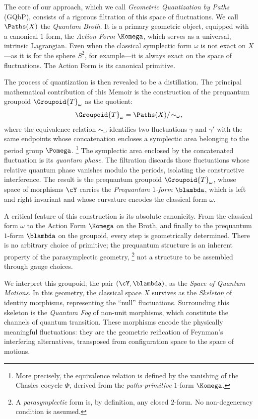 The core of our approach,
which we call \emph{Geometric Quantization by Paths} (GQbP),
consists of a rigorous filtration of this space of fluctuations.
We call $\Paths(X)$ the \emph{Quantum Broth}.
It is a primary geometric object,
equipped with a canonical $1$-form,
the \emph{Action Form} $\Komega$,
which serves as a universal,
intrinsic Lagrangian.
Even when the classical symplectic form $\omega$ is not exact on $X$---as it is for the sphere $S^2$, for example---it is always exact on the space of fluctuations.
The Action Form is its canonical primitive.

The process of quantization is then revealed to be a distillation.
The principal mathematical contribution of this Memoir is the construction of the prequantum groupoid $\Groupoid{T}_\omega$ as the quotient:
\[
  \Groupoid{T}_\omega = \Paths(X)/\!\sim_\omega,
  \]
where the equivalence relation $\sim_\omega$ identifies two fluctuations $\gamma$ and $\gamma'$
with the same endpoints whose concatenation encloses a symplectic area belonging to the period group $\Pomega$.%
\footnote{More precisely,
the equivalence relation is defined by the vanishing of the Chasles cocycle $\Phi$,
derived from the \emph{paths-primitive} $1$-form $\Komega$.}
The symplectic area enclosed by the concatenated fluctuation is its \emph{quantum phase}.
The filtration discards those fluctuations whose relative quantum phase vanishes modulo the periods,
isolating the constructive interference.
The result is the prequantum groupoid $\Groupoid{T}_\omega$,
whose space of morphisms $\cY$ carries the \emph{Prequantum $1$-form} $\blambda$,
which is left and right invariant and whose curvature encodes the classical form $\omega$.

A critical feature of this construction is its absolute canonicity.
From the classical form $\omega$ to the Action Form $\Komega$ on the Broth,
and finally to the prequantum $1$-form $\blambda$ on the groupoid,
every step is geometrically determined.
There is no arbitrary choice of primitive;
the prequantum structure is an inherent property of the parasymplectic geometry,%
\footnote{A \emph{parasymplectic} form is,
by definition,
any closed $2$-form.
No non-degeneracy condition is assumed.}
not a structure to be assembled through gauge choices.

We interpret this groupoid,
the pair $(\cY,\blambda)$,
as the \emph{Space of Quantum Motions}.
In this geometry,
the classical space $X$ survives as the \emph{Skeleton} of identity morphisms,
representing the ``null'' fluctuations.
Surrounding this skeleton is the \emph{Quantum Fog} of non-unit morphisms,
which constitute the channels of quantum transition.
These morphisms encode the physically meaningful fluctuations:
they are the geometric reification of Feynman's interfering alternatives,
transposed from configuration space to the space of motions.

